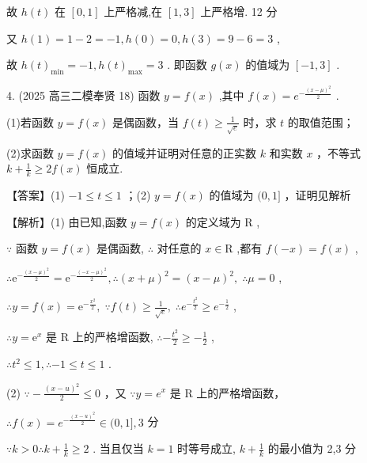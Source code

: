\documentclass[10pt]{article}
\begin{document}
故 \(h\left( t\right)\) 在 \(\left\lbrack  {0,1}\right\rbrack\) 上严格减,在 \(\left\lbrack  {1,3}\right\rbrack\) 上严格增. 12 分

又 \(h\left( 1\right)  = 1 - 2 =  - 1,h\left( 0\right)  = 0,h\left( 3\right)  = 9 - 6 = 3\) ,

故 \(h{\left( t\right) }_{\min } =  - 1,h{\left( t\right) }_{\max } = 3\) . 即函数 \(g\left( x\right)\) 的值域为 \(\left\lbrack  {-1,3}\right\rbrack\) .

4. (2025 高三二模奉贤 18) 函数 \(y = f\left( x\right)\) ,其中 \(f\left( x\right)  = {e}^{-\frac{{\left( x - \mu \right) }^{2}}{2}}\) .

(1)若函数 \(y = f\left( x\right)\) 是偶函数，当 \(f\left( t\right)  \geq  \frac{1}{\sqrt{e}}\) 时，求 \(t\) 的取值范围；

(2)求函数 \(y = f\left( x\right)\) 的值域并证明对任意的正实数 \(k\) 和实数 \(x\) ，不等式 \(k + \frac{1}{k} \geq  {2f}\left( x\right)\) 恒成立.

【答案】(1) \(- 1 \leq  t \leq  1\) ；(2) \(y = f\left( x\right)\) 的值域为 \((0,1\rbrack\) ，证明见解析

【解析】(1) 由已知,函数 \(y = f\left( x\right)\) 的定义域为 \(\mathrm{R}\) ,

\(\because\) 函数 \(y = f\left( x\right)\) 是偶函数, \(\therefore\) 对任意的 \(x \in  \mathrm{R}\) ,都有 \(f\left( {-x}\right)  = f\left( x\right)\) ,

\(\therefore {\mathrm{e}}^{-\frac{{\left( x - \mu \right) }^{2}}{2}} = {\mathrm{e}}^{-\frac{{\left( -x - \mu \right) }^{2}}{2}},\therefore {\left( x + \mu \right) }^{2} = {\left( x - \mu \right) }^{2},\;\therefore \mu  = 0\) ,

\(\therefore y = f\left( x\right)  = {\mathrm{e}}^{-\frac{{x}^{2}}{2}},\;\because f\left( t\right)  \geq  \frac{1}{\sqrt{e}},\;\therefore {e}^{-\frac{{t}^{2}}{2}} \geq  {e}^{-\frac{1}{2}}\) ,

\(\therefore y = {\mathrm{e}}^{x}\) 是 \(\mathrm{R}\) 上的严格增函数, \(\therefore  - \frac{{t}^{2}}{2} \geq   - \frac{1}{2}\) ,

\(\therefore {t}^{2} \leq  1,\therefore  - 1 \leq  t \leq  1\) .

(2) \(\because  - \frac{{\left( x - u\right) }^{2}}{2} \leq  0\) ，又 \(\because y = {e}^{x}\) 是 \(\mathrm{R}\) 上的严格增函数，

\(\therefore f\left( x\right)  = {e}^{-\frac{{\left( x - u\right) }^{2}}{2}} \in  (0,1\rbrack ,3\) 分

\(\because k > 0\therefore k + \frac{1}{k} \geq  2\) . 当且仅当 \(k = 1\) 时等号成立, \(k + \frac{1}{k}\) 的最小值为 2,3 分
\end{document}
